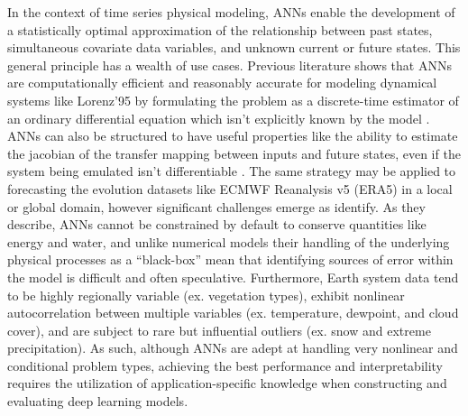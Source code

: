 In the context of time series physical modeling, ANNs enable the development of a statistically optimal approximation of the relationship between past states, simultaneous covariate data variables, and unknown current or future states. This general principle has a wealth of use cases. Previous literature shows that ANNs are computationally efficient and reasonably accurate for modeling dynamical systems like Lorenz'95 by formulating the problem as a discrete-time estimator of an ordinary differential equation which isn't explicitly known by the model \citep{fablet_bilinear_2018}. ANNs can also be structured to have useful properties like the ability to estimate the jacobian of the transfer mapping between inputs and future states, even if the system being emulated isn't differentiable \citep{nonnenmacher_deep_2021}. The same strategy may be applied to forecasting the evolution datasets like ECMWF Reanalysis v5 (ERA5) in a local or global domain, however significant challenges emerge as \citep{dueben_challenges_2018} identify. As they describe, ANNs cannot be constrained by default to conserve quantities like energy and water, and unlike numerical models their handling of the underlying physical processes as a ``black-box'' mean that identifying sources of error within the model is difficult and often speculative. Furthermore, Earth system data tend to be highly regionally variable (ex. vegetation types), exhibit nonlinear autocorrelation between multiple variables (ex. temperature, dewpoint, and cloud cover), and are subject to rare but influential outliers (ex. snow and extreme precipitation). As such, although ANNs are adept at handling very nonlinear and conditional problem types, achieving the best performance and interpretability requires the utilization of application-specific knowledge when constructing and evaluating deep learning models.

